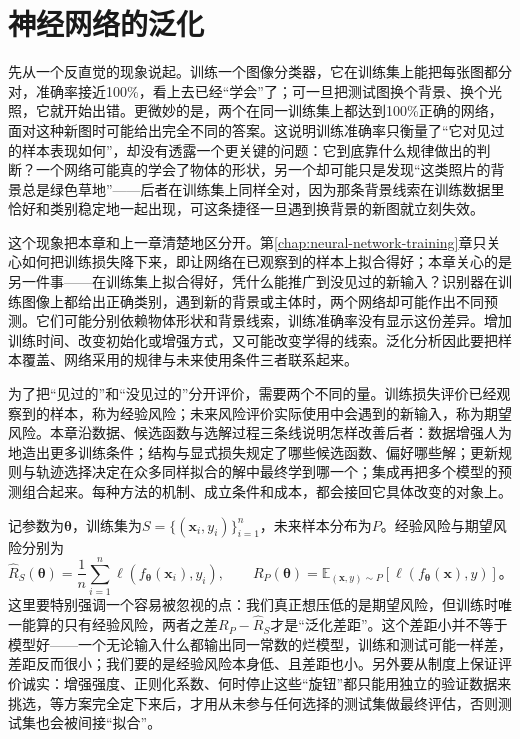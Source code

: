 \chapter{神经网络的泛化}
\label{chap:neural-network-generalization}

先从一个反直觉的现象说起。训练一个图像分类器，它在训练集上能把每张图都分对，准确率接近100\%，看上去已经“学会”了；可一旦把测试图换个背景、换个光照，它就开始出错。更微妙的是，两个在同一训练集上都达到100\%正确的网络，面对这种新图时可能给出完全不同的答案。这说明训练准确率只衡量了“它对见过的样本表现如何”，却没有透露一个更关键的问题：它到底靠什么规律做出的判断？一个网络可能真的学会了物体的形状，另一个却可能只是发现“这类照片的背景总是绿色草地”——后者在训练集上同样全对，因为那条背景线索在训练数据里恰好和类别稳定地一起出现，可这条捷径一旦遇到换背景的新图就立刻失效。

这个现象把本章和上一章清楚地区分开。第\ref{chap:neural-network-training}章只关心如何把训练损失降下来，即让网络在已观察到的样本上拟合得好；本章关心的是另一件事——在训练集上拟合得好，凭什么能推广到没见过的新输入？识别器在训练图像上都给出正确类别，遇到新的背景或主体时，两个网络却可能作出不同预测。它们可能分别依赖物体形状和背景线索，训练准确率没有显示这份差异。增加训练时间、改变初始化或增强方式，又可能改变学得的线索。泛化分析因此要把样本覆盖、网络采用的规律与未来使用条件三者联系起来。

为了把“见过的”和“没见过的”分开评价，需要两个不同的量。训练损失评价已经观察到的样本，称为经验风险；未来风险评价实际使用中会遇到的新输入，称为期望风险。本章沿数据、候选函数与选解过程三条线说明怎样改善后者：数据增强人为地造出更多训练条件；结构与显式损失规定了哪些候选函数、偏好哪些解；更新规则与轨迹选择决定在众多同样拟合的解中最终学到哪一个；集成再把多个模型的预测组合起来。每种方法的机制、成立条件和成本，都会接回它具体改变的对象上。

记参数为$\bm\theta$，训练集为$S=\{(\bm x_i,y_i)\}_{i=1}^n$，未来样本分布为$P$。经验风险与期望风险分别为
\begin{equation}
  \hat R_S(\bm\theta)=\frac1n\sum_{i=1}^n
    \ell(f_{\bm\theta}(\bm x_i),y_i),\qquad
  R_P(\bm\theta)=\mathbb E_{(\bm x,y)\sim P}
    [\ell(f_{\bm\theta}(\bm x),y)]\text{。}
  \label{eq:generalization-risks}
\end{equation}
这里要特别强调一个容易被忽视的点：我们真正想压低的是期望风险，但训练时唯一能算的只有经验风险，两者之差$R_P-\hat R_S$才是“泛化差距”。这个差距小并不等于模型好——一个无论输入什么都输出同一常数的烂模型，训练和测试可能一样差，差距反而很小；我们要的是经验风险本身低、且差距也小。另外要从制度上保证评价诚实：增强强度、正则化系数、何时停止这些“旋钮”都只能用独立的验证数据来挑选，等方案完全定下来后，才用从未参与任何选择的测试集做最终评估，否则测试集也会被间接“拟合”。

